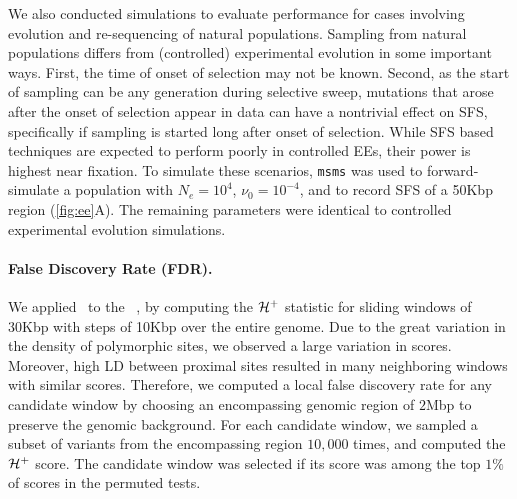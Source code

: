 We also conducted simulations to evaluate performance for cases
involving evolution and re-sequencing of natural populations. Sampling
from natural populations differs from (controlled) experimental
evolution in some important ways. First, the time of onset of
selection may not be known. Second, as the start of sampling can be
any generation during selective sweep, mutations that arose after the
onset of selection appear in data can have a nontrivial effect on SFS,
specifically if sampling is started long after onset of
selection. While SFS based techniques are expected to perform poorly
in controlled EEs, their power is highest near fixation. To simulate
these scenarios, \texttt{msms} was used to forward-simulate a
population with $N_e=10^4$, $\nu_0=10^{-4}$, and to record SFS of a
50Kbp region (\ref{fig:ee}A). The remaining parameters 
were
identical to controlled experimental evolution simulations.

\paragraph{False Discovery Rate (FDR).} We applied \comale\ to the
\datadm~\cite{orozco2012adaptation,franssen2015patterns}, by computing the 
${\cal H}^{+}$
statistic for sliding windows of 30Kbp with steps of 10Kbp over the
entire genome. Due to the great variation in the density of polymorphic
sites, we observed a large variation in scores. Moreover, high LD
between proximal sites resulted in many neighboring windows with
similar scores. Therefore, we computed a local false discovery rate
for any candidate window by choosing an encompassing genomic region of
$2$Mbp to preserve the genomic background. For each candidate window,
we sampled a subset of variants from the encompassing region $10,000$
times, and computed the ${\cal H}^+$ score. The candidate window was
selected if its score was among the top $1\%$ of scores in the
permuted tests.
